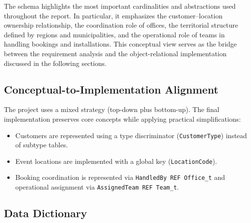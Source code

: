 \documentclass[12pt,a4paper]{article}
\begin{document}
The schema highlights the most important cardinalities and abstractions used throughout the report. In particular, it emphasizes the customer--location ownership relationship, the coordination role of offices, the territorial structure defined by regions and municipalities, and the operational role of teams in handling bookings and installations. This conceptual view serves as the bridge between the requirement analysis and the object-relational implementation discussed in the following sections.

\subsection{Conceptual-to-Implementation Alignment}
The project uses a mixed strategy (top-down plus bottom-up). The final implementation preserves core concepts while applying practical simplifications:
\begin{itemize}
    \item Customers are represented using a type discriminator (\texttt{CustomerType}) instead of subtype tables.
    \item Event locations are implemented with a global key (\texttt{LocationCode}).
    \item Booking coordination is represented via \texttt{HandledBy REF Office\_t} and operational assignment via \texttt{AssignedTeam REF Team\_t}.
\end{itemize}

\subsection{Data Dictionary}
\end{document}
